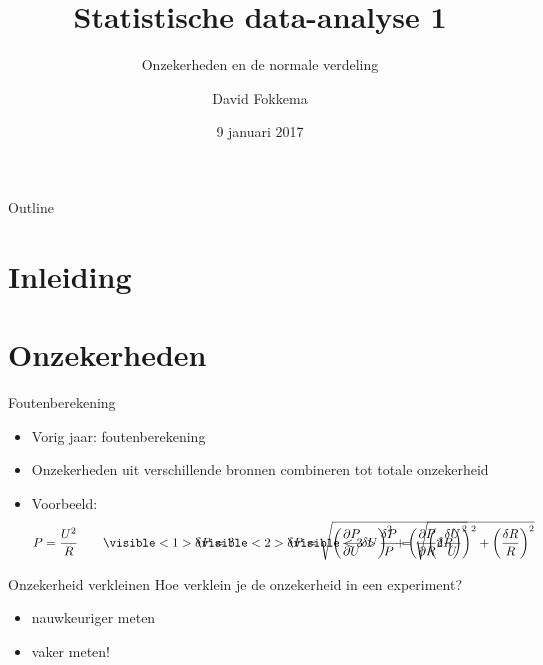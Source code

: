 \documentclass{beamer}
\title{Statistische data-analyse 1}
\subtitle{Onzekerheden en de normale verdeling}
\author{David Fokkema}
\institute{
  Practicum natuurkunde \\
  Vrije Universiteit / Universiteit van Amsterdam
}
\date{9 januari 2017}
\begin{document}
\begin{frame}
  \titlepage
\end{frame}

\begin{frame}{Outline}
  \tableofcontents
\end{frame}




\section{Inleiding}

\begin{frame}{}
\end{frame}


\section{Onzekerheden}

\begin{frame}{Foutenberekening}
  \begin{itemize}
    \item Vorig jaar: foutenberekening
    \item Onzekerheden uit verschillende bronnen combineren tot totale onzekerheid
    \item Voorbeeld:
    \begin{equation*}
        P = \frac{U^2}{R} \qquad
        \visible<1>
        {\mathrlap{\delta P = \ ?}}
        \visible<2>
        {\mathrlap{\delta P = \sqrt{\left(\frac{\partial P}{\partial U}\delta U\right)^2 + \left(\frac{\partial P}{\partial R}\delta R\right)^2}}}
        \visible<3>
        {\frac{\delta P}{P} = \sqrt{\left(2\frac{\delta U}{U}\right)^2 + \left(\frac{\delta R}{R}\right)^2}}
    \end{equation*}
  \end{itemize}
\end{frame}

\begin{frame}{Onzekerheid verkleinen}
  Hoe verklein je de onzekerheid in een experiment?
  \begin{itemize}
    \item nauwkeuriger meten
    \item<2-> \alert{vaker} meten!
  \end{itemize}
\end{frame}
\end{document}
